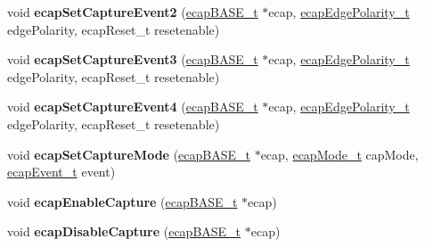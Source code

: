 \begin{DoxyCompactItemize}
\item 
\mbox{\label{group__eCAP_ga865bdd5cf4cc6a4dc6ff97f7a1d6316a}} 
void {\bfseries ecap\+Set\+Capture\+Event2} (\mbox{\hyperlink{reg__ecap_8h_a8ca3ed15315b354b71b837ed4b6685a9}{ecap\+B\+A\+S\+E\+\_\+t}} $\ast$ecap, \mbox{\hyperlink{ecap_8h_a9f14adf05b628329f7acc029eef7d151}{ecap\+Edge\+Polarity\+\_\+t}} edge\+Polarity, ecap\+Reset\+\_\+t resetenable)
\item 
\mbox{\label{group__eCAP_ga4d2d1e92ea5c46696144feaae27620b7}} 
void {\bfseries ecap\+Set\+Capture\+Event3} (\mbox{\hyperlink{reg__ecap_8h_a8ca3ed15315b354b71b837ed4b6685a9}{ecap\+B\+A\+S\+E\+\_\+t}} $\ast$ecap, \mbox{\hyperlink{ecap_8h_a9f14adf05b628329f7acc029eef7d151}{ecap\+Edge\+Polarity\+\_\+t}} edge\+Polarity, ecap\+Reset\+\_\+t resetenable)
\item 
\mbox{\label{group__eCAP_ga83b5c8a14c27814f2fc642d84f0f0539}} 
void {\bfseries ecap\+Set\+Capture\+Event4} (\mbox{\hyperlink{reg__ecap_8h_a8ca3ed15315b354b71b837ed4b6685a9}{ecap\+B\+A\+S\+E\+\_\+t}} $\ast$ecap, \mbox{\hyperlink{ecap_8h_a9f14adf05b628329f7acc029eef7d151}{ecap\+Edge\+Polarity\+\_\+t}} edge\+Polarity, ecap\+Reset\+\_\+t resetenable)
\item 
\mbox{\label{group__eCAP_gaa778204610087d5deec470344482e88d}} 
void {\bfseries ecap\+Set\+Capture\+Mode} (\mbox{\hyperlink{reg__ecap_8h_a8ca3ed15315b354b71b837ed4b6685a9}{ecap\+B\+A\+S\+E\+\_\+t}} $\ast$ecap, \mbox{\hyperlink{ecap_8h_ae12ad948e43f257694d02e2872b2b27b}{ecap\+Mode\+\_\+t}} cap\+Mode, \mbox{\hyperlink{ecap_8h_a7c2a55e9667d02c465325f1b4e05b604}{ecap\+Event\+\_\+t}} event)
\item 
\mbox{\label{group__eCAP_gae6f82e5c201091d635eb4b95a1883e8c}} 
void {\bfseries ecap\+Enable\+Capture} (\mbox{\hyperlink{reg__ecap_8h_a8ca3ed15315b354b71b837ed4b6685a9}{ecap\+B\+A\+S\+E\+\_\+t}} $\ast$ecap)
\item 
\mbox{\label{group__eCAP_ga24454f89735edb8cf4b970f4f9d5447f}} 
void {\bfseries ecap\+Disable\+Capture} (\mbox{\hyperlink{reg__ecap_8h_a8ca3ed15315b354b71b837ed4b6685a9}{ecap\+B\+A\+S\+E\+\_\+t}} $\ast$ecap)
\item 
\mbox{\label{group__eCAP_ga48f20fedb8c4985bd364dd996045a966}} 

\end{DoxyCompactItemize}

